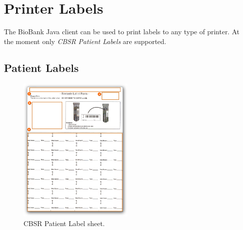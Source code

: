 \chapter{Printer Labels}
\label{chap:printer_labels}

The BioBank Java client can be used to print labels to any type of printer. At
the moment only \emph{CBSR Patient Labels} are supported.

\section{Patient Labels}
\label{sec:printer_labels}

\begin{figure}
  \vspace{-20pt}
  \begin{center}
    \includegraphics[width=0.5\textwidth]{screenshots/printer_labels/01_cbsr_patient_label_sheet}
  \end{center}
  \caption{CBSR Patient Label sheet.}
  \label{fig:cbsr_patient_label_sheet}
  \vspace{-15pt}
\end{figure}


